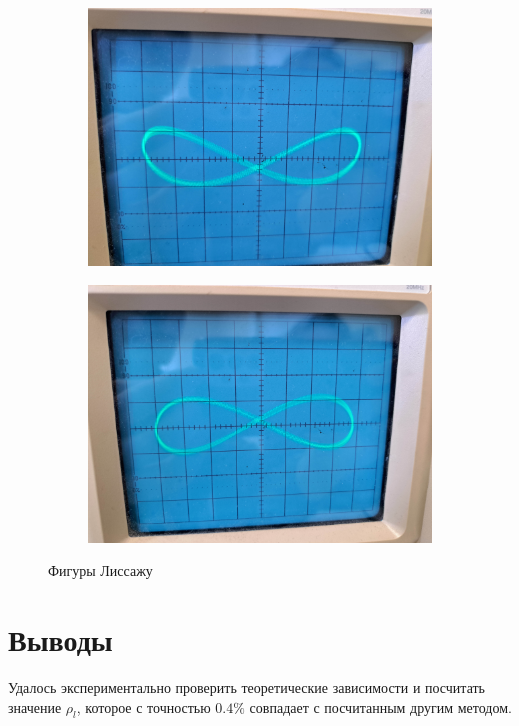 \documentclass[a4paper, 12pt]{article}
\begin{document}
\begin{figure}[H]
    \bigskip 
    
    \begin{subfigure}[b]{0.45\textwidth}
        \centering
        \includegraphics[width=\textwidth]{3.jpg}
    \end{subfigure}
    \hfill
    \begin{subfigure}[b]{0.45\textwidth}
        \centering
        \includegraphics[width=\textwidth]{4.jpg}
    \end{subfigure}
    
    \caption{Фигуры Лиссажу}
    \label{fig:all_four}
\end{figure}



\section{Выводы}
Удалось экспериментально проверить теоретические зависимости и посчитать значение \(\rho_l\), которое с точностью \(0.4\%\) совпадает с посчитанным другим методом. 
\end{document}
